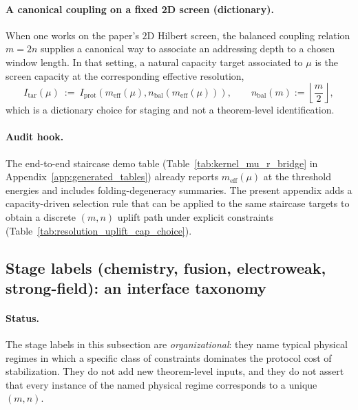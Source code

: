 \paragraph{A canonical coupling on a fixed 2D screen (dictionary).}
\InterfaceTag When one works on the paper's $2$D Hilbert screen, the balanced coupling relation $m=2n$ supplies a canonical way to associate an addressing depth to a chosen window length.
In that setting, a natural capacity target associated to $\mu$ is the screen capacity at the corresponding effective resolution,
\[
I_{\mathrm{tar}}(\mu)\ :=\ I_{\mathrm{prot}}(m_{\mathrm{eff}}(\mu), n_{\mathrm{bal}}(m_{\mathrm{eff}}(\mu))),
\qquad
n_{\mathrm{bal}}(m):=\left\lfloor\frac{m}{2}\right\rfloor,
\]
which is a dictionary choice for staging and not a theorem-level identification.

\paragraph{Audit hook.}
\AuditTag The end-to-end staircase demo table (Table~\ref{tab:kernel_mu_r_bridge} in Appendix~\ref{app:generated_tables}) already reports $m_{\mathrm{eff}}(\mu)$ at the threshold energies and includes folding-degeneracy summaries.
The present appendix adds a capacity-driven selection rule that can be applied to the same staircase targets to obtain a discrete $(m,n)$ uplift path under explicit constraints (Table~\ref{tab:resolution_uplift_cap_choice}).

\subsection{Stage labels (chemistry, fusion, electroweak, strong-field): an interface taxonomy}
\label{subsec:uplift_stage_labels_taxonomy}

\paragraph{Status.}
\InterfaceTag The stage labels in this subsection are \emph{organizational}: they name typical physical regimes in which a specific class of constraints dominates the protocol cost of stabilization.
They do not add new theorem-level inputs, and they do not assert that every instance of the named physical regime corresponds to a unique $(m,n)$.

